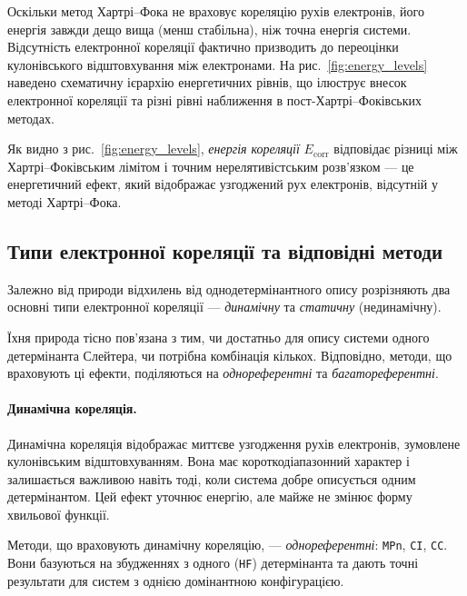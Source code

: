 Оскільки метод Хартрі–Фока не враховує кореляцію рухів електронів,
його енергія завжди дещо вища (менш стабільна), ніж точна енергія системи.
Відсутність електронної кореляції фактично призводить до переоцінки кулонівського відштовхування між електронами.
На рис.~\ref{fig:energy_levels} наведено схематичну ієрархію енергетичних рівнів,
що ілюструє внесок електронної кореляції та різні рівні наближення в пост-Хартрі–Фоківських методах.

Як видно з рис.~\ref{fig:energy_levels}, \emph{енергія кореляції} $E_{\text{corr}}$ відповідає різниці між Хартрі–Фоківським лімітом і точним нерелятивістським розв’язком ---
це енергетичний ефект, який відображає узгоджений рух електронів, відсутній у методі Хартрі–Фока.


\subsection{Типи електронної кореляції та відповідні методи}

Залежно від природи відхилень від однодетермінантного опису розрізняють два основні типи електронної кореляції ---
\emph{динамічну} та \emph{статичну} (нединамічну).

Їхня природа тісно пов’язана з тим, чи достатньо для опису системи
одного детермінанта Слейтера, чи потрібна комбінація кількох.
Відповідно, методи, що враховують ці ефекти, поділяються на
\emph{однореферентні} та \emph{багатореферентні}.

\paragraph{Динамічна кореляція.}

Динамічна кореляція відображає миттєве узгодження рухів електронів,
зумовлене кулонівським відштовхуванням.
Вона має короткодіапазонний характер і залишається важливою навіть тоді,
коли система добре описується одним детермінантом.
Цей ефект уточнює енергію, але майже не змінює форму хвильової функції.

Методи, що враховують динамічну кореляцію, --- \emph{однореферентні}: \texttt{MPn}, \texttt{CI}, \texttt{CC}.
Вони базуються на збудженнях з одного (\texttt{HF}) детермінанта
та дають точні результати для систем з однією домінантною конфігурацією.

